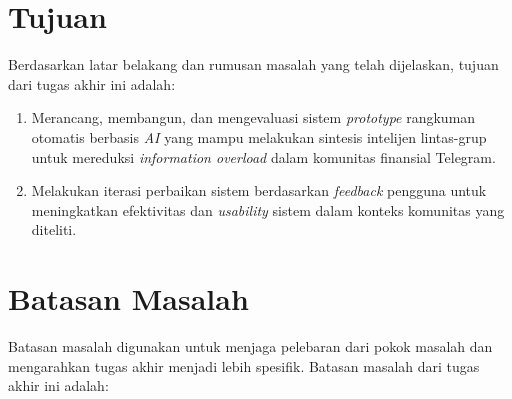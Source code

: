 \section{Tujuan}
Berdasarkan latar belakang dan rumusan masalah yang telah dijelaskan, tujuan dari tugas akhir ini adalah:

\begin{enumerate}
\item Merancang, membangun, dan mengevaluasi sistem \textit{prototype} rangkuman otomatis berbasis \textit{AI} yang mampu melakukan sintesis intelijen lintas-grup untuk mereduksi \textit{information overload} dalam komunitas finansial Telegram.
\item Melakukan iterasi perbaikan sistem berdasarkan \textit{feedback} pengguna untuk meningkatkan efektivitas dan \textit{usability} sistem dalam konteks komunitas yang diteliti.
\end{enumerate}

\section{Batasan Masalah}
Batasan masalah digunakan untuk menjaga pelebaran dari pokok masalah dan mengarahkan tugas akhir menjadi lebih spesifik. Batasan masalah dari tugas akhir ini adalah:

